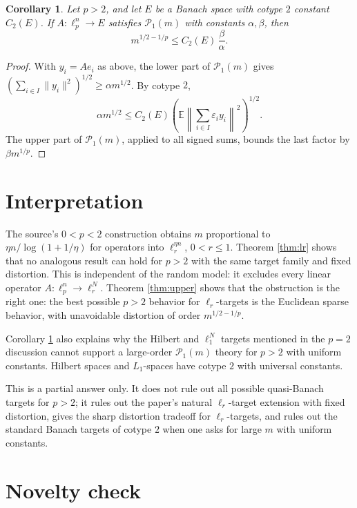 \documentclass[11pt]{article}
\newtheorem{corollary}{Corollary}
\newcommand{\E}{\mathbb E}
\begin{document}
\begin{corollary}\label{cor:cotype}
Let \(p>2\), and let \(E\) be a Banach space with cotype \(2\) constant
\(C_2(E)\).  If \(A:\ell_p^n\to E\) satisfies \(\mathcal P_1(m)\) with
constants \(\alpha,\beta\), then
\[
  m^{1/2-1/p}\le C_2(E)\,\frac{\beta}{\alpha}.
\]
\end{corollary}

\begin{proof}
With \(y_i=Ae_i\) as above, the lower part of \(\mathcal P_1(m)\) gives
\((\sum_{i\in I}\|y_i\|^2)^{1/2}\ge \alpha m^{1/2}\).  By cotype \(2\),
\[
  \alpha m^{1/2}
  \le C_2(E)\left(\E\left\|\sum_{i\in I}\varepsilon_i y_i\right\|^2\right)^{1/2}.
\]
The upper part of \(\mathcal P_1(m)\), applied to all signed sums, bounds the
last factor by \(\beta m^{1/p}\).
\end{proof}

\section{Interpretation}

The source's \(0<p<2\) construction obtains \(m\) proportional to
\(\eta n/\log(1+1/\eta)\) for operators into \(\ell_r^{\eta n}\), \(0<r\le1\).
Theorem \ref{thm:lr} shows that no analogous result can hold for \(p>2\) with
the same target family and fixed distortion.  This is independent of the
random model: it excludes every linear operator \(A:\ell_p^n\to\ell_r^N\).
Theorem \ref{thm:upper} shows that the obstruction is the right one: the best
possible \(p>2\) behavior for \(\ell_r\)-targets is the Euclidean sparse
behavior, with unavoidable distortion of order \(m^{1/2-1/p}\).

Corollary \ref{cor:cotype} also explains why the Hilbert and \(\ell_1^N\)
targets mentioned in the \(p=2\) discussion cannot support a large-order
\(\mathcal P_1(m)\) theory for \(p>2\) with uniform constants.  Hilbert spaces
and \(L_1\)-spaces have cotype \(2\) with universal constants.

This is a partial answer only.  It does not rule out all possible quasi-Banach
targets for \(p>2\); it rules out the paper's natural \(\ell_r\)-target
extension with fixed distortion, gives the sharp distortion tradeoff for
\(\ell_r\)-targets, and rules out the standard Banach targets of cotype \(2\)
when one asks for large \(m\) with uniform constants.

\section{Novelty check}
\end{document}
